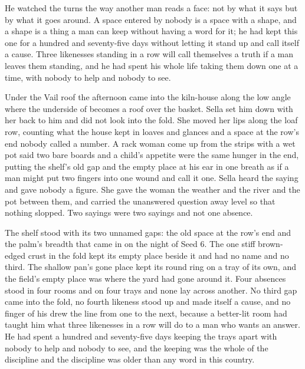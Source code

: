 He watched the turns the way another man reads a face: not by what it says but by what it goes around. A space entered by nobody is a space with a shape, and a shape is a thing a man can keep without having a word for it; he had kept this one for a hundred and seventy-five days without letting it stand up and call itself a cause. Three likenesses standing in a row will call themselves a truth if a man leaves them standing, and he had spent his whole life taking them down one at a time, with nobody to help and nobody to see.

\scenebreak

Under the Vail roof the afternoon came into the kiln-house along the low angle where the underside of  becomes a roof over the basket. Sella set him down with her back to him and did not look into the fold. She moved her lips along the loaf row, counting what the house kept in loaves and glances and a space at the row's end nobody called a number. A rack woman come up from the strips with a wet pot said two bare boards and a child's appetite were the same hunger in the end, putting the shelf's old gap and the empty place at his ear in one breath as if a man might put two fingers into one wound and call it one. Sella heard the saying and gave nobody a figure. She gave the woman the weather and the river and the pot between them, and carried the unanswered question away level so that nothing slopped. Two sayings were two sayings and not one absence.

The shelf stood with its two unnamed gaps: the old space at the row's end and the palm's breadth that came in on the night of Seed 6. The one stiff brown-edged crust in the fold kept its empty place beside it and had no name and no third. The shallow pan's gone place kept its round ring on a tray of its own, and the field's empty place was where the yard had gone around it. Four absences stood in four rooms and on four trays and none lay across another. No third gap came into the fold, no fourth likeness stood up and made itself a cause, and no finger of his drew the line from one to the next, because a better-lit room had taught him what three likenesses in a row will do to a man who wants an answer. He had spent a hundred and seventy-five days keeping the trays apart with nobody to help and nobody to see, and the keeping was the whole of the discipline and the discipline was older than any word in this country.

